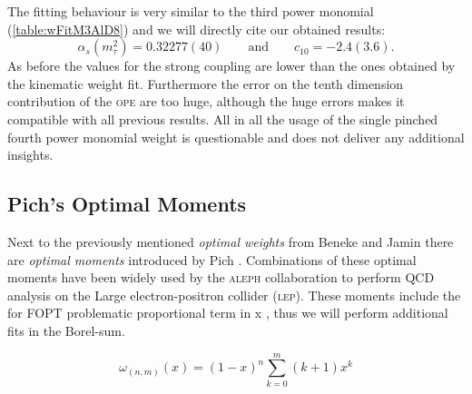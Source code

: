 \documentclass[../../index.tex]{subfiles}
\begin{document}
The fitting behaviour is very similar to the third power monomial
(\cref{table:wFitM3AlD8}) and we will directly cite our obtained results:
\begin{equation}
  \alpha_s(m_\tau^2) = 0.32277(40) \qquad \text{and} \qquad c_{10}=-2.4(3.6).
\end{equation}
As before the values for the strong coupling are lower than the ones obtained by
the kinematic weight fit. Furthermore the error on the tenth dimension
contribution of the \textsc{ope} are too huge, although the huge errors makes it
compatible with all previous results. All in all the usage of the single pinched
fourth power monomial weight is questionable and does not deliver any additional insights.

\subsection{Pich's Optimal Moments \cite{Pich2016}}
Next to the previously mentioned \textit{optimal weights} from Beneke and Jamin
\cite{Beneke2012} there are \textit{optimal moments} introduced by Pich
\cite{LeDiberder1992}. Combinations of these optimal moments have been widely
used by the \textsc{aleph} collaboration to perform QCD analysis on the Large electron-positron
collider (\textsc{lep}). These moments include the for \textsc{FOPT} problematic
proportional term in x \cite{Beneke2012}, thus we will perform additional fits
in the Borel-sum.

\begin{equation}
  \omega_{(n,m)}(x) = (1-x)^n\sum_{k=0}^m (k+1)x^k 
\end{equation}
\end{document}
